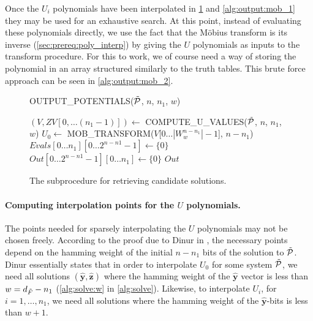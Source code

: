 Once the $U_i$ polynomials have been interpolated in \cref{alg:output:mob_0} and \cref{alg:output:mob_1} they may be used for an exhaustive search. At this point, instead of evaluating these polynomials directly, we use the fact that the Möbius transform is its inverse (\cref{sec:prereq:poly_interp}) by giving the $U$ polynomials as inputs to the transform procedure. For this to work, we of course need a way of storing the polynomial in an array structured similarly to the truth tables. This brute force approach can be seen in \cref{alg:output:mob_2}.


\begin{figure}[ht]
    \centering
    \begin{alg}
        \caption{OUTPUT\_POTENTIALS($\Tilde{\mathcal{P}}$, $n$, $n_1$, $w$)}
        \label{alg:output}
        $(V, ZV[0,\dots(n_1 - 1)]) \gets $ COMPUTE\_U\_VALUES($\Tilde{\mathcal{P}}$, $n$, $n_1$, $w$)\; \label{alg:output:uvalues}
        $U_0 \gets$ MOB\_TRANSFORM($V$[$0\dots |W^{n - n_1}_{w}| - 1$], $n - n_1$)\; \label{alg:output:mob_0}
        $Evals[0\dots n_1][0\dots 2^{n - n1} - 1] \gets \{0\}$\;
        $Out[0\dots 2^{n - n1} - 1][0\dots n_1] \gets \{0\}$\;
        \Return $Out$\;
    \end{alg}
    \caption{The subprocedure for retrieving candidate solutions.}
\end{figure}

\paragraph{Computing interpolation points for the $U$ polynomials.} The points needed for sparsely interpolating the $U$ polynomials may not be chosen freely. According to the proof due to Dinur in \cite{eurocrypt-2021-30841}, the necessary points depend on the hamming weight of the initial $n - n_1$ bits of the solution to $\Tilde{\mathcal{P}}$. Dinur essentially states that in order to interpolate $U_0$ for some system $\Tilde{\mathcal{P}}$, we need all solutions $(\hat{\mathbf{y}}, \hat{\mathbf{z}})$ where the hamming weight of the $\hat{\mathbf{y}}$ vector is less than $w = d_{\Tilde{F}} - n_1$ (\cref{alg:solve:w} in \cref{alg:solve}). Likewise, to interpolate $U_i$, for $i = 1, \dots, n_1$, we need all solutions where the hamming weight of the $\hat{\mathbf{y}}$-bits is less than $w + 1$.

